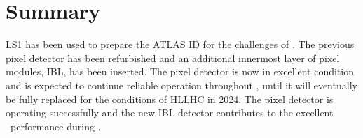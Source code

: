 \section{Summary}
\gls{LS1} has been used to prepare the \gls{ATLAS} \gls{ID} for the challenges of \RunTwo. The previous pixel detector has been refurbished and an additional innermost layer of pixel modules, \gls{IBL}, has been inserted. The pixel detector is now in excellent condition and is expected to continue reliable operation throughout \RunTwo, until it will eventually be fully replaced for the conditions of \gls{HLLHC} in 2024.
%
The pixel detector is operating successfully and the new \gls{IBL} detector contributes to the excellent \btag\ performance during \RunTwo.